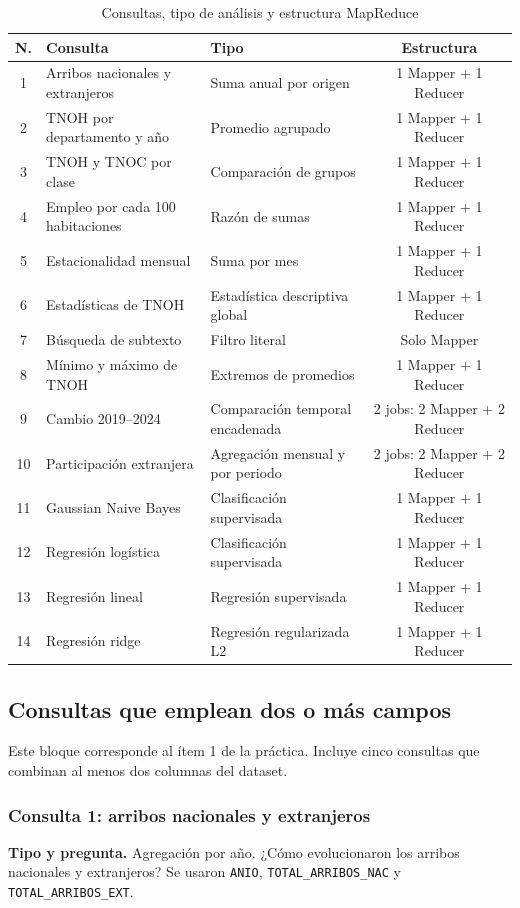 \documentclass[10pt,a4paper]{article}
\theoremstyle{definition}
\begin{document}
\begin{table}[H]
\centering\scriptsize
\caption{Consultas, tipo de análisis y estructura MapReduce}
\label{tab:resumen-consultas}
\begin{tabular}{c p{} p{} c}
\toprule
\textbf{N.} & \textbf{Consulta} & \textbf{Tipo} & \textbf{Estructura} \\
\midrule
1 & Arribos nacionales y extranjeros & Suma anual por origen & 1 Mapper + 1 Reducer \\
2 & TNOH por departamento y año & Promedio agrupado & 1 Mapper + 1 Reducer \\
3 & TNOH y TNOC por clase & Comparación de grupos & 1 Mapper + 1 Reducer \\
4 & Empleo por cada 100 habitaciones & Razón de sumas & 1 Mapper + 1 Reducer \\
5 & Estacionalidad mensual & Suma por mes & 1 Mapper + 1 Reducer \\
6 & Estadísticas de TNOH & Estadística descriptiva global & 1 Mapper + 1 Reducer \\
7 & Búsqueda de subtexto & Filtro literal & Solo Mapper \\
8 & Mínimo y máximo de TNOH & Extremos de promedios & 1 Mapper + 1 Reducer \\
9 & Cambio 2019--2024 & Comparación temporal encadenada & 2 jobs: 2 Mapper + 2 Reducer \\
10 & Participación extranjera & Agregación mensual y por periodo & 2 jobs: 2 Mapper + 2 Reducer \\
11 & Gaussian Naive Bayes & Clasificación supervisada & 1 Mapper + 1 Reducer \\
12 & Regresión logística & Clasificación supervisada & 1 Mapper + 1 Reducer \\
13 & Regresión lineal & Regresión supervisada & 1 Mapper + 1 Reducer \\
14 & Regresión ridge & Regresión regularizada L2 & 1 Mapper + 1 Reducer \\
\bottomrule
\end{tabular}
\end{table}

\subsection{Consultas que emplean dos o más campos}
Este bloque corresponde al ítem 1 de la práctica. Incluye cinco consultas que
combinan al menos dos columnas del dataset.
\subsubsection{Consulta 1: arribos nacionales y extranjeros}
\textbf{Tipo y pregunta.} Agregación por año. ¿Cómo evolucionaron los arribos
nacionales y extranjeros? Se usaron \texttt{ANIO},
\texttt{TOTAL\_ARRIBOS\_NAC} y \texttt{TOTAL\_ARRIBOS\_EXT}.
\end{document}
